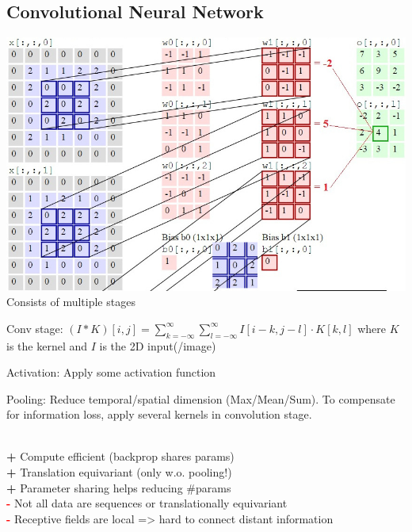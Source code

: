 \subsection*{Convolutional Neural Network}
\includegraphics[width=\textwidth/4]{ETH-DS-2020/AML/Resources/conv2.jpg}
 Consists of multiple stages\\
\begin{inparaitem}[$\color{mygreen} \triangleright$]
\item Conv stage: $(I*K)[i,j] = \sum_{k=-\infty}^{\infty}\sum_{l=-\infty}^{\infty}I[i-k,j-l] \cdot K[k,l]$ where $K$ is the kernel and $I$ is the 2D input(/image)\\
\item Activation: Apply some activation function\\
\item Pooling: Reduce temporal/spatial dimension (Max/Mean/Sum). To compensate for information loss, apply several kernels in convolution stage.\\
\end{inparaitem}
\\
\textbf{\textcolor{mygreen}{+}} Compute efficient (backprop shares params)\\
\textbf{\textcolor{mygreen}{+}} Translation equivariant (only w.o. pooling!)\\
\textbf{\textcolor{mygreen}{+}} Parameter sharing helps reducing \#params\\
\textbf{\textcolor{red}{-}} Not all data are sequences or translationally equivariant\\
\textbf{\textcolor{red}{-}} Receptive fields are local => hard to connect distant information\\
